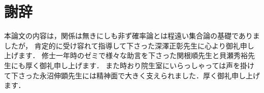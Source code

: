 \chapter*{謝辞}
	本論文の内容は，関係は無きにしも非ず確率論とは程遠い集合論の基礎でありましたが，
	肯定的に受け容れて指導して下さった深澤正彰先生に心より御礼申し上げます．
	修士一年時のゼミで様々な助言を下さった関根順先生と貝瀬秀裕先生にも厚く御礼申し上げます．
	また時おり院生室にいらっしゃっては声を掛けて下さった永沼伸顕先生には精神面で大きく支えられました．厚く御礼申し上げます．